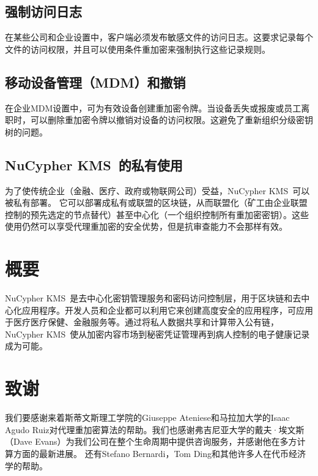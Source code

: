 \documentclass[longbibliography,nofootinbib]{revtex4-1}
\newcommand{\kms}{NuCypher KMS}
\begin{document}
\subsection{强制访问日志}

        在某些公司和企业设置中，客户端必须发布敏感文件的访问日志。这要求记录每个文件的访问权限，并且可以使用条件重加密来强制执行这些记录规则。

\subsection{移动设备管理（MDM）和撤销}
\label{sec:mdm}

    在企业MDM设置中，可为有效设备创建重加密令牌。当设备丢失或报废或员工离职时，可以删除重加密令牌以撤销对设备的访问权限。这避免了重新组织分级密钥树的问题。

\subsection{\kms~的私有使用}

        为了使传统企业（金融、医疗、政府或物联网公司）受益，\kms~可以被私有部署。 它可以部署成私有或联盟的区块链，从而联盟化（矿工由企业联盟控制的预先选定的节点替代）甚至中心化（一个组织控制所有重加密密钥）。这些使用仍然可以享受代理重加密的安全优势，但是抗审查能力不会那样有效。

\section{概要}
        
    \kms~是去中心化密钥管理服务和密码访问控制层，用于区块链和去中心化应用程序。开发人员和企业都可以利用它来创建高度安全的应用程序，可应用于医疗医疗保健、金融服务等。通过将私人数据共享和计算带入公有链，\kms~使从加密内容市场到秘密凭证管理再到病人控制的电子健康记录成为可能。


\section{致谢}

        我们要感谢来着斯蒂文斯理工学院的Giuseppe Ateniese和马拉加大学的Isaac Agudo Ruiz对代理重加密算法的帮助。我们也感谢弗吉尼亚大学的戴夫·埃文斯（Dave Evans）为我们公司在整个生命周期中提供咨询服务，并感谢他在多方计算方面的最新进展。 还有Stefano Bernardi，Tom Ding和其他许多人在代币经济学的帮助。
    


\end{document}
